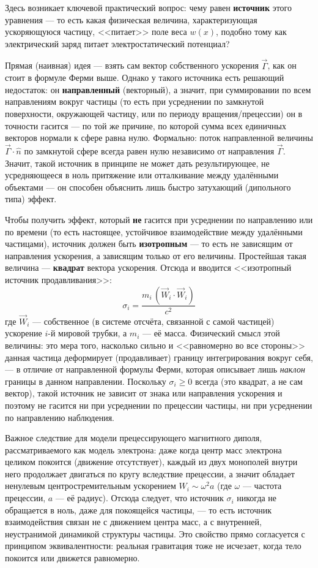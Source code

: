 \documentclass[12pt,a4paper]{article}
\begin{document}
Здесь возникает ключевой практический вопрос: чему равен
\textbf{источник} этого уравнения --- то есть какая физическая
величина, характеризующая ускоряющуюся частицу, <<питает>> поле веса
$w(x)$, подобно тому как электрический заряд питает электростатический
потенциал?

Прямая (наивная) идея --- взять сам вектор собственного ускорения
$\vec\Gamma$, как он стоит в формуле Ферми выше. Однако у такого
источника есть решающий недостаток: он \textbf{направленный} (векторный),
а значит, при суммировании по всем направлениям вокруг частицы (то есть
при усреднении по замкнутой поверхности, окружающей частицу, или по
периоду вращения/прецессии) он в точности гасится --- по той же
причине, по которой сумма всех единичных векторов нормали к сфере равна
нулю. Формально: поток направленной величины $\vec\Gamma\cdot\hat n$ по
замкнутой сфере всегда равен нулю независимо от направления
$\vec\Gamma$. Значит, такой источник в принципе не может дать
результирующее, не усредняющееся в ноль притяжение или отталкивание
между удалёнными объектами --- он способен объяснить лишь быстро
затухающий (дипольного типа) эффект.

Чтобы получить эффект, который \textbf{не} гасится при усреднении по
направлению или по времени (то есть настоящее, устойчивое
взаимодействие между удалёнными частицами), источник должен быть
\textbf{изотропным} --- то есть не зависящим от направления ускорения,
а зависящим только от его величины. Простейшая такая величина ---
\textbf{квадрат} вектора ускорения. Отсюда и вводится <<изотропный
источник продавливания>>:
\begin{equation}
\boxed{\ \sigma_i = \frac{m_i\,(\vec W_i\cdot\vec W_i)}{c^2}\ }
\end{equation}
где $\vec W_i$ --- собственное (в системе отсчёта, связанной с
самой частицей) ускорение $i$-й мировой трубки, а $m_i$ --- её масса.
Физический смысл этой величины: это мера того, насколько сильно и
<<равномерно во все стороны>> данная частица деформирует (продавливает)
границу интегрирования вокруг себя, --- в отличие от направленной
формулы Ферми, которая описывает лишь \emph{наклон} границы в данном
направлении. Поскольку $\sigma_i\ge0$ всегда (это квадрат, а не сам
вектор), такой источник не зависит от знака или направления ускорения
и поэтому не гасится ни при усреднении по прецессии частицы, ни при
усреднении по направлению наблюдения.

Важное следствие для модели прецессирующего магнитного диполя,
рассматриваемого как модель электрона: даже когда центр масс электрона
целиком покоится (движение отсутствует), каждый из двух монополей
внутри него продолжает двигаться по кругу вследствие прецессии, а
значит обладает ненулевым центростремительным ускорением
$W_i\sim\omega^2a$ (где $\omega$ --- частота прецессии, $a$ --- её
радиус). Отсюда следует, что источник $\sigma_i$ никогда не обращается
в ноль, даже для покоящейся частицы, --- то есть источник
взаимодействия связан не с движением центра масс, а с внутренней,
неустранимой динамикой структуры частицы. Это свойство прямо
согласуется с принципом эквивалентности: реальная гравитация тоже не
исчезает, когда тело покоится или движется равномерно.
\end{document}
